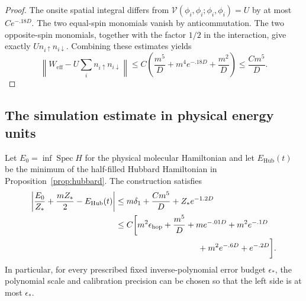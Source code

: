 \begin{proof}
The onsite spatial integral differs from
\(\mathcal V(\phi_i,\phi_i;\phi_i,\phi_i)=U\)
by at most \(Ce^{-.18D}\).  The two equal-spin monomials
vanish by anticommutation.  The two opposite-spin monomials,
together with the factor \(1/2\) in the interaction, give
exactly \(U n_{i\uparrow}n_{i\downarrow}\).
Combining these estimates yields
\[
 \left\|W_{\mathrm{eff}}
       -U\sum_i n_{i\uparrow}n_{i\downarrow}\right\|
 \le C\left(\frac{m^5}{D}
       +m^4e^{-.18D}+\frac{m^2}{D}\right)
 \le\frac{Cm^5}{D}.
\]
\end{proof}

\subsection{The simulation estimate in physical energy units}

\begin{proposition}
\label{prop:continuum-simulation}
Let \(E_0=\inf\operatorname{Spec}H\) for the physical molecular
Hamiltonian and let \(E_{\mathrm{Hub}}(t)\) be the minimum of
the half-filled Hubbard Hamiltonian in
Proposition~\ref{prop:hubbard}.  The construction satisfies
\begin{align}
 \left|\frac{E_0}{Z_*}+\frac{mZ_*}{2}
                   -E_{\mathrm{Hub}}(t)\right|
 &\le m\delta_1+\frac{Cm^5}{D}+Z_*e^{-1.2D}
       \label{eq:continuum-simulation-units}\\
 &\le C\biggl[
       m^2\epsilon_{\mathrm{hop}}+\frac{m^5}{D}
       +m e^{-.01D}+m^2e^{-.1D}\notag\\
 &\hspace{35mm}{}+m^2e^{-.6D}+e^{-.2D}
       \biggr].\label{eq:continuum-simulation-final}
\end{align}
In particular, for every prescribed fixed inverse-polynomial
error budget \(\epsilon_*\), the polynomial scale and calibration
precision can be chosen so that the left side is at most
\(\epsilon_*\).
\end{proposition}

